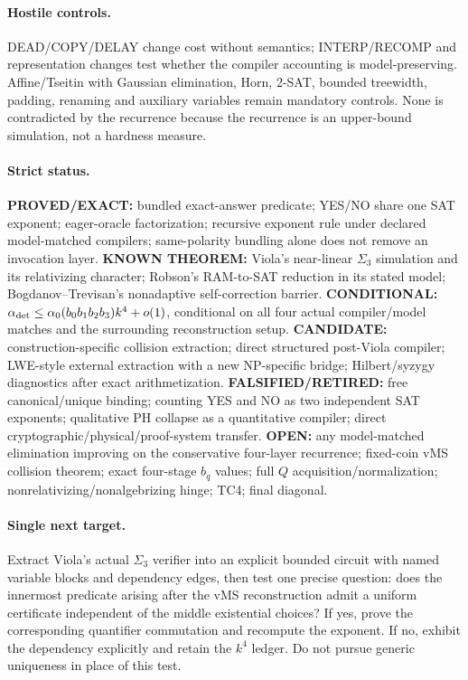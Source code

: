 \documentclass[11pt]{article}
\begin{document}
\paragraph{Hostile controls.}
DEAD/COPY/DELAY change cost without semantics; INTERP/RECOMP and representation changes test whether the compiler accounting is model-preserving. Affine/Tseitin with Gaussian elimination, Horn, 2-SAT, bounded treewidth, padding, renaming and auxiliary variables remain mandatory controls. None is contradicted by the recurrence because the recurrence is an upper-bound simulation, not a hardness measure.

\paragraph{Strict status.}
\textbf{PROVED/EXACT:} bundled exact-answer predicate; YES/NO share one SAT exponent; eager-oracle factorization; recursive exponent rule under declared model-matched compilers; same-polarity bundling alone does not remove an invocation layer.
\textbf{KNOWN THEOREM:} Viola's near-linear $\Sigma_3$ simulation and its relativizing character; Robson's RAM-to-SAT reduction in its stated model; Bogdanov--Trevisan's nonadaptive self-correction barrier.
\textbf{CONDITIONAL:} $\alpha_{\rm det}\le\alpha_0(b_0b_1b_2b_3)k^4+o(1)$, conditional on all four actual compiler/model matches and the surrounding reconstruction setup.
\textbf{CANDIDATE:} construction-specific collision extraction; direct structured post-Viola compiler; LWE-style external extraction with a new NP-specific bridge; Hilbert/syzygy diagnostics after exact arithmetization.
\textbf{FALSIFIED/RETIRED:} free canonical/unique binding; counting YES and NO as two independent SAT exponents; qualitative PH collapse as a quantitative compiler; direct cryptographic/physical/proof-system transfer.
\textbf{OPEN:} any model-matched elimination improving on the conservative four-layer recurrence; fixed-coin vMS collision theorem; exact four-stage $b_q$ values; full $Q$ acquisition/normalization; nonrelativizing/nonalgebrizing hinge; TC4; final diagonal.

\paragraph{Single next target.}
Extract Viola's actual $\Sigma_3$ verifier into an explicit bounded circuit with named variable blocks and dependency edges, then test one precise question: does the innermost predicate arising after the vMS reconstruction admit a uniform certificate independent of the middle existential choices? If yes, prove the corresponding quantifier commutation and recompute the exponent. If no, exhibit the dependency explicitly and retain the $k^4$ ledger. Do not pursue generic uniqueness in place of this test.
\end{document}
